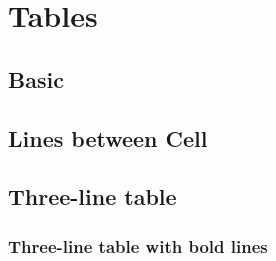 \chapter{Tables}

\section{Basic}


\section{Lines between Cell}


\section{Three-line table}


\subsection{Three-line table with bold lines}